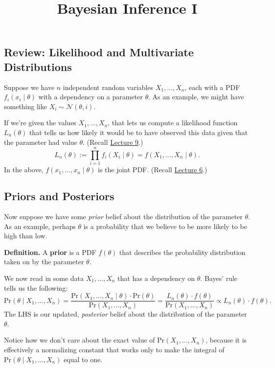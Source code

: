 \title{Bayesian Inference I}



\subsection{Review: Likelihood and Multivariate Distributions}

Suppose we have $n$ independent random variables $X_1, \dots, X_n$,
each with a PDF $f_i(x_i \mid \theta)$ with a dependency
on a parameter $\theta$.
As an example, we might have something like $X_i \sim \mathcal{N}(\theta, i)$.

If we're given the values $X_1, \dots, X_n$,
that lets us compute a likelihood function $L_n(\theta)$
that tells us how likely it would be
to have observed this data given that the parameter had value $\theta$.
(Recall \href{/18.650/lectures/9/#defining-the-maximum-likelihood-estimator-mle}{Lecture 9}.)
\[ L_n(\theta) := \prod_{i = 1}^n f_i(X_i \mid \theta)
= f(X_1, \dots, X_n \mid \theta). \]
In the above, $f(x_1, \dots, x_n \mid \theta)$ is the joint PDF.
(Recall \href{/18.650/lectures/6/#multivariate-pdfs}{Lecture 6}.)

\subsection{Priors and Posteriors}

Now suppose we have some \emph{prior} belief
about the distribution of the parameter $\theta$.
As an example, perhaps $\theta$ is a probability
that we believe to be more likely to be high than low.

\textbf{Definition.}
A \textbf{prior} is a PDF $f(\theta)$
that describes the probability distribution
taken on by the parameter $\theta$.

We now read in some data $X_1, \dots, X_n$
that has a dependency on $\theta$.
Bayes' rule tells us the following:
\[ \mathrm{Pr}(\theta \mid X_1, \dots, X_n)
= \frac{
    \mathrm{Pr}(X_1, \dots, X_n \mid \theta) \cdot \mathrm{Pr}(\theta)
}{
    \mathrm{Pr}(X_1, \dots, X_n)
}
= \frac{L_n(\theta) \cdot f(\theta)}{\mathrm{Pr}(X_1, \dots, X_n)}
\propto L_n(\theta) \cdot f(\theta). \]
The LHS is our updated, \emph{posterior} belief
about the distribution of the parameter $\theta$.

\begin{remark}
    Notice how we don't care about
    the exact value of $\mathrm{Pr}(X_1, \dots, X_n)$,
    because it is effectively a normalizing constant
    that works only to make the integral of
    $\mathrm{Pr}(\theta \mid X_1, \dots, X_n)$
    equal to one.
\end{remark}

